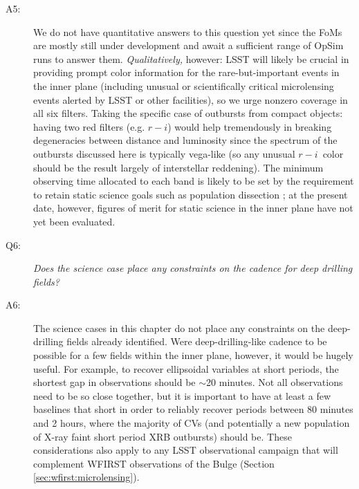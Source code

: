 \begin{description}
\item[A5:] We do not have quantitative answers to this question
  yet since the FoMs are mostly still under development and await a
  sufficient range of OpSim runs to answer them. {\it Qualitatively,}
  however: LSST will likely be crucial in providing prompt color
  information for the rare-but-important events in the inner plane
  (including unusual or scientifically critical microlensing events
  alerted by LSST or other facilities), so we urge nonzero coverage in
  all six filters. Taking the specific case of outbursts from compact
  objects: having two red filters (e.g. $r-i$) would help tremendously
  in breaking degeneracies between distance and luminosity since the
  spectrum of the outbursts discussed here is typically vega-like (so
  any unusual $r-i$~color should be the result largely of interstellar
  reddening). The minimum observing time allocated to each band is likely to be set by the requirement to retain static science goals such as population dissection \citep[see, e.g.][]{ivezic08}; at the present date, however, figures of merit for static science in the inner plane have not yet been evaluated.

\item[Q6:] {\it Does the science case place any constraints on the cadence for deep drilling fields?}

\item[A6:] The science cases in this chapter do not place any
  constraints on the deep-drilling fields already identified. Were
  deep-drilling-like cadence to be possible for a few fields within
  the inner plane, however, it would be hugely useful. For example, to
  recover ellipsoidal variables at short periods, the shortest gap in
  observations should be $\sim$20 minutes. Not all observations need
  to be so close together, but it is important to have at least a few
  baselines that short in order to reliably recover periods between 80
  minutes and 2 hours, where the majority of CVs (and potentially a
  new population of X-ray faint short period XRB outbursts) should
  be. These considerations also apply to any LSST observational campaign that will complement WFIRST observations of the Bulge (Section \ref{sec:wfirst:microlensing}).


\end{description}
